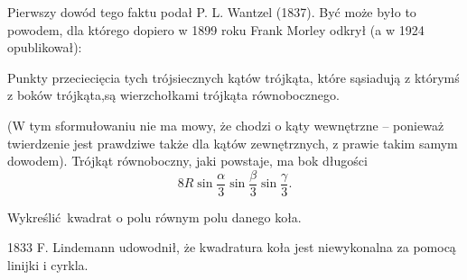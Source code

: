 Pierwszy dowód tego faktu podał P. L. Wantzel (1837).
Być może było to powodem, dla którego dopiero w 1899 roku Frank Morley odkrył (a w 1924 opublikował):

\begin{theorem}[Morleya]
    Punkty przeciecięcia tych trójsiecznych kątów trójkąta, które sąsiadują z którymś z boków trójkąta,są wierzchołkami trójkąta równobocznego.
\end{theorem}

(W tym sformułowaniu nie ma mowy, że chodzi o kąty wewnętrzne -- ponieważ twierdzenie jest prawdziwe także dla kątów zewnętrznych, z prawie takim samym dowodem).
Trójkąt równoboczny, jaki powstaje, ma bok długości
\begin{equation}
    8 R \sin \frac \alpha 3 \sin \frac \beta 3 \sin \frac \gamma 3.
\end{equation}

\begin{problem}
    Wykreślić kwadrat o polu równym polu danego koła.
\end{problem}

1833 F. Lindemann udowodnił, że kwadratura koła jest niewykonalna za pomocą linijki i cyrkla.



